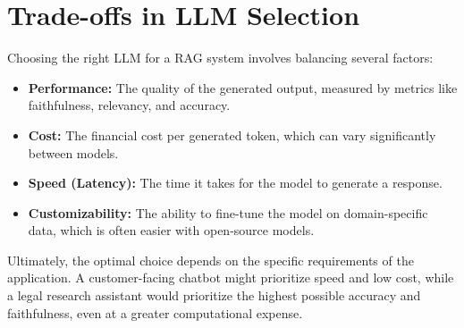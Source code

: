 \section{Trade-offs in LLM Selection}
Choosing the right LLM for a RAG system involves balancing several factors:
\begin{itemize}
    \item \textbf{Performance:} The quality of the generated output, measured by metrics like faithfulness, relevancy, and accuracy.
    \item \textbf{Cost:} The financial cost per generated token, which can vary significantly between models.
    \item \textbf{Speed (Latency):} The time it takes for the model to generate a response.
    \item \textbf{Customizability:} The ability to fine-tune the model on domain-specific data, which is often easier with open-source models.
\end{itemize}

Ultimately, the optimal choice depends on the specific requirements of the application. A customer-facing chatbot might prioritize speed and low cost, while a legal research assistant would prioritize the highest possible accuracy and faithfulness, even at a greater computational expense.